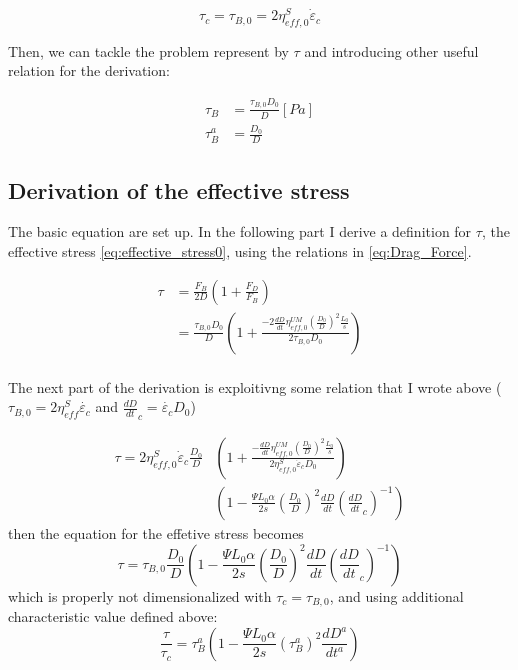 \documentclass{article}
\begin{document}
\begin{equation}
    \tau_c = \tau_{B,0} = 2\eta^S_{eff,0}\dot{\varepsilon}_c
    \label{eq:tau_B_0_eq0}
\end{equation}



Then, we can tackle the problem represent by $\tau$ and introducing other useful relation for the derivation: 

\begin{align}
    \tau_B &= \frac{\tau_{B,0}D_0}{D} [Pa] \\
    \tau_B^{a}&= \frac{D_0}{D} 
\end{align}
\subsection{Derivation of the effective stress}
The basic equation are set up. In the following part I derive a definition for $\tau$, the effective stress \eqref{eq:effective_stress0}, using the relations in \eqref{eq:Drag_Force}.

\begin{align}
\tau &= \frac{F_B}{2D}\left(1+\frac{F_D}{F_B}\right)\\
&= \frac{\tau_{B,0} D_0}{D}\left(1+\frac{-2\frac{dD}{dt}\eta^{UM}_{eff,0}\left(\frac{D_0}{D}\right)^2\frac{L_0}{s}}{2 \tau_{B,0}D_0}\right)\\
\label{eq:effective_stress1}
\end{align}

The next part of the derivation is exploitivng some relation that I wrote above ($\tau_{B,0}=2\eta^S_{eff}\dot{\varepsilon_c}$ and $\frac{dD}{dt}_c = \dot{\varepsilon_c}D_0$)

\begin{align}
   \tau = 2\eta^S_{eff,0}\dot{\varepsilon}_c\frac{ D_0}{D} &\left(1+\frac{-\frac{dD}{dt}\eta^{UM}_{eff,0}\left(\frac{D_0}{D}\right)^2\frac{L_0}{s}}{2\eta^S_{eff,0}\dot{\varepsilon}_c D_0}\right)\\
   &\left( 1-\frac{\Psi L_0 \alpha}{2 s}\left(\frac{D_0}{D}\right)^2 \frac{dD}{dt}\left(\frac{dD}{dt}_c\right)^{-1}\right)
\end{align}
then the equation for the effetive stress becomes
\begin{equation}
    \tau = \tau_{B,0} \frac{D_0}{D} \left( 1-\frac{\Psi L_0 \alpha}{2 s}\left(\frac{D_0}{D}\right)^2 \frac{dD}{dt}\left(\frac{dD}{dt}_c\right)^{-1}\right)
\end{equation}
which is properly not dimensionalized with $\tau_c = \tau_{B,0}$, and using additional characteristic value defined above: 
\begin{equation}
    \frac{\tau}{\tau_c} = \tau^{a}_{B} \left( 1-\frac{\Psi L_0 \alpha}{2 s}\left(\tau^{a}_B\right)^2 \frac{dD^{a}}{dt^{a}}\right)
    \label{eq:no_d_tau_eff}
\end{equation}
\end{document}
